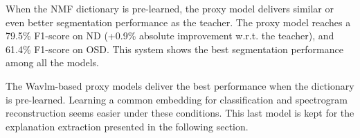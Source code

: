 When the NMF dictionary is pre-learned, the proxy model delivers similar or even better segmentation performance as the teacher.
The proxy model reaches a 79.5\% F1-score on ND (+0.9\% absolute improvement w.r.t. the teacher), and 61.4\% F1-score on OSD.
This system shows the best segmentation performance among all the models.

The Wavlm-based proxy models deliver the best performance when the dictionary is pre-learned.
Learning a common embedding for classification and spectrogram reconstruction seems easier under these conditions.
This last model is kept for the explanation extraction presented in the following section.
